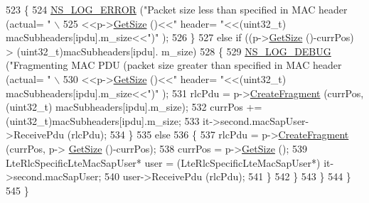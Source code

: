 \begin{DoxyCode}
523                                 \{
524                                         \hyperlink{group__logging_ga0261a8db1d4ac5f79417d117634fd455}{NS\_LOG\_ERROR} (\textcolor{stringliteral}{"Packet size less than specified in MAC
       header (actual= "} \(\backslash\)
525                                                       <<p->\hyperlink{classns3_1_1Packet_a462855c9929954d4301a4edfe55f4f1c}{GetSize} ()<<\textcolor{stringliteral}{" header= "}<<(uint32\_t)
      macSubheaders[ipdu].m\_size<<\textcolor{stringliteral}{")"} );
526                                 \}
527                                 \textcolor{keywordflow}{else} \textcolor{keywordflow}{if} ((p->\hyperlink{classns3_1_1Packet_a462855c9929954d4301a4edfe55f4f1c}{GetSize} ()-currPos) > (uint32\_t)macSubheaders[ipdu].
      m\_size)
528                                 \{
529                                         \hyperlink{group__logging_ga413f1886406d49f59a6a0a89b77b4d0a}{NS\_LOG\_DEBUG} (\textcolor{stringliteral}{"Fragmenting MAC PDU (packet size greater
       than specified in MAC header (actual= "} \(\backslash\)
530                                                       <<p->\hyperlink{classns3_1_1Packet_a462855c9929954d4301a4edfe55f4f1c}{GetSize} ()<<\textcolor{stringliteral}{" header= "}<<(uint32\_t)
      macSubheaders[ipdu].m\_size<<\textcolor{stringliteral}{")"} );
531                                         rlcPdu = p->\hyperlink{classns3_1_1Packet_a16f6113606b355b2b346e2245fa2a3d0}{CreateFragment} (currPos, (uint32\_t)
      macSubheaders[ipdu].m\_size);
532                                         currPos += (uint32\_t)macSubheaders[ipdu].m\_size;
533                                         it->second.macSapUser->ReceivePdu (rlcPdu);
534                                 \}
535                                 \textcolor{keywordflow}{else}
536                                 \{
537                                         rlcPdu = p->\hyperlink{classns3_1_1Packet_a16f6113606b355b2b346e2245fa2a3d0}{CreateFragment} (currPos, p->
      \hyperlink{classns3_1_1Packet_a462855c9929954d4301a4edfe55f4f1c}{GetSize} ()-currPos);
538                                         currPos = p->\hyperlink{classns3_1_1Packet_a462855c9929954d4301a4edfe55f4f1c}{GetSize} ();
539                                         LteRlcSpecificLteMacSapUser* user = (LteRlcSpecificLteMacSapUser*)
      it->second.macSapUser;
540                                         user->ReceivePdu (rlcPdu);
541                                 \}
542                         \}
543                 \}
544         \}
545 \}
\end{DoxyCode}


